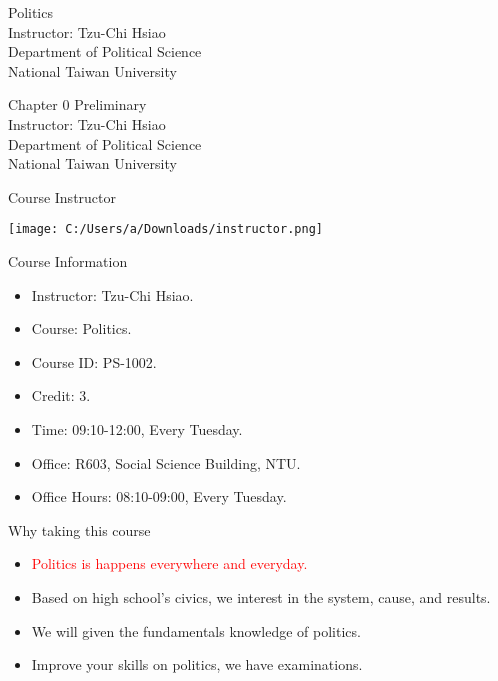\documentclass{beamer}
\title{}
\author{}
\date{}
\begin{document}
\begin{frame}
\begin{center}
\Large{Politics} \\
\vspace{3em}
\normalsize{Instructor: Tzu-Chi Hsiao} \\
\vspace{3em}
\small{Department of Political Science} \\
\vspace{1em}
\small{National Taiwan University}
\end{center}
\end{frame}
\begin{frame}
\begin{center}
\Large{Chapter 0 Preliminary} \\
\vspace{3em}
\normalsize{Instructor: Tzu-Chi Hsiao} \\
\vspace{3em}
\small{Department of Political Science} \\
\vspace{1em}
\small{National Taiwan University} \\
\end{center}
\end{frame}
\begin{frame}{Course Instructor}
\begin{center}
\texttt{[image: C:/Users/a/Downloads/instructor.png]}
\end{center}
\end{frame}
\begin{frame}{Course Information}
\begin{itemize}
\pause
\item Instructor: Tzu-Chi Hsiao.
\pause
\item Course: Politics.
\pause
\item Course ID: PS-1002.
\pause
\item Credit: 3.
\pause
\item Time: 09:10-12:00, Every Tuesday.
\pause
\item Office: R603, Social Science Building, NTU.
\pause
\item Office Hours: 08:10-09:00, Every Tuesday.
\end{itemize}
\end{frame}
\begin{frame}{Why taking this course}
\begin{itemize}
\pause
\item \textcolor{red}{Politics is happens everywhere and everyday.}
\pause
\item Based on high school's civics, we interest in the system, cause, and results.
\pause
\item We will given the fundamentals knowledge of politics.
\pause
\item Improve your skills on politics, we have examinations.
\end{itemize}
\end{frame}
\end{document}

